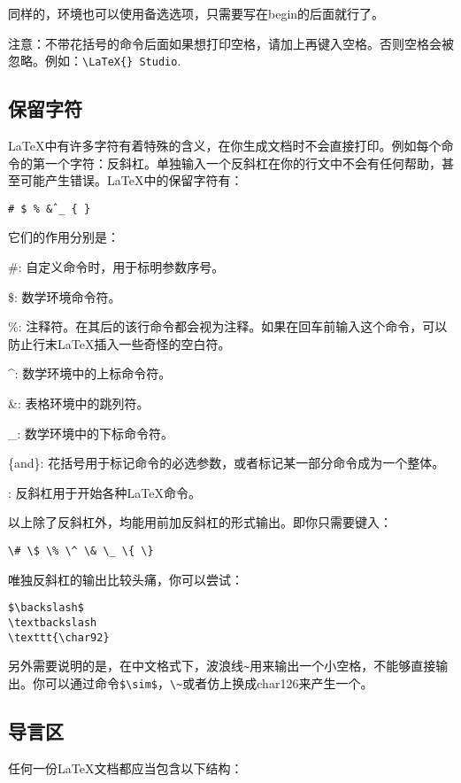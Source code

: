同样的，环境也可以使用备选选项，只需要写在begin的后面就行了。

注意：不带花括号的命令后面如果想打印空格，请加上再键入空格。否则空格会被忽略。例如：\verb+\LaTeX{} Studio+. 

\subsection{保留字符}

\LaTeX 中有许多字符有着特殊的含义，在你生成文档时不会直接打印。例如每个命令的第一个字符：反斜杠。单独输入一个反斜杠在你的行文中不会有任何帮助，甚至可能产生错误。\LaTeX 中的保留字符有：
\begin{center}
\texttt{\# \$ \% \^ \& \_ \{ \} }
\end{center}

它们的作用分别是：
\begin{para}
\item[\#{}:] 自定义命令时，用于标明参数序号。
\item[\${}:] 数学环境命令符。
\item[\%{}:] 注释符。在其后的该行命令都会视为注释。如果在回车前输入这个命令，可以防止行末\LaTeX 插入一些奇怪的空白符。
\item[\^{}:] 数学环境中的上标命令符。
\item[\&{}:] 表格环境中的跳列符。
\item[\_{}:] 数学环境中的下标命令符。
\item[\{and\}:] 花括号用于标记命令的必选参数，或者标记某一部分命令成为一个整体。
\item[\char92{}:] 反斜杠用于开始各种\LaTeX 命令。
\end{para}

以上除了反斜杠外，均能用前加反斜杠的形式输出。即你只需要键入：
\begin{center}
\verb|\# \$ \% \^ \& \_ \{ \}|
\end{center}

唯独反斜杠的输出比较头痛，你可以尝试：
\begin{verbatim}
$\backslash$
\textbackslash
\texttt{\char92}
\end{verbatim}

另外需要说明的是，在中文格式下，波浪线{\texttt{\~}}用来输出一个小空格，不能够直接输出。你可以通过命令\verb+$\sim$+，\verb|\~|或者仿上换成char126来产生一个。

\subsection{导言区}
任何一份\LaTeX{}文档都应当包含以下结构：

